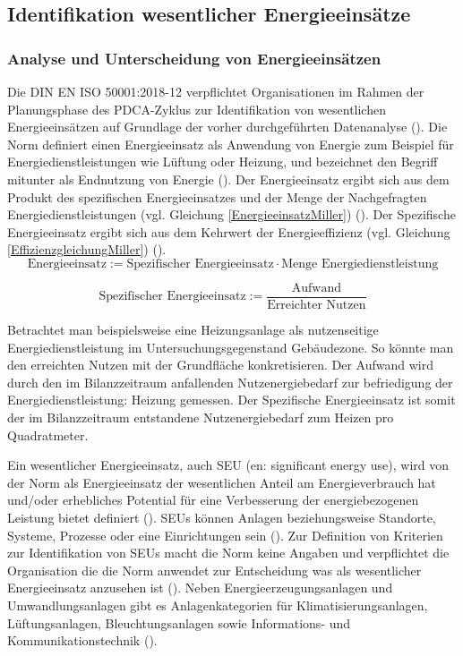 \subsection{Identifikation wesentlicher Energieeinsätze}

\subsubsection{Analyse und Unterscheidung von Energieeinsätzen}

Die DIN EN ISO 50001:2018-12 verpflichtet Organisationen im Rahmen der Planungsphase des PDCA-Zyklus zur Identifikation von wesentlichen Energieeinsätzen auf Grundlage 
der vorher durchgeführten Datenanalyse (\cite[S. 25]{DIN50001.2018}).
Die Norm definiert einen Energieeinsatz als Anwendung von Energie zum Beispiel für Energiedienstleistungen wie Lüftung oder Heizung, und bezeichnet den Begriff mitunter als 
Endnutzung von Energie (\cite[Kapitel 3.5.4]{DIN50001.2018}). 
Der Energieeinsatz ergibt sich aus dem Produkt des spezifischen Energieeinsatzes und der Menge der Nachgefragten Energiedienstleistungen (vgl. Gleichung \eqref{EnergieeinsatzMiller}) (\cite[S. 120]{Miller.2016}).
Der Spezifische Energieeinsatz ergibt sich aus dem Kehrwert der Energieeffizienz (vgl. Gleichung \eqref{EffizienzgleichungMiller}) (\cite[S. 120]{Miller.2016}).
\begin{equation}
    \text{Energieeinsatz} := \text{Spezifischer Energieeinsatz} \cdot \text{Menge Energiedienstleistung}
    \label{EnergieeinsatzMiller}
\end{equation}

\begin{equation}
    \text{Spezifischer Energieeinsatz} :=\frac{\text{Aufwand}}{\text{Erreichter Nutzen}}
    \label{SepzifischerEnergieinsatzMiller}
\end{equation}

Betrachtet man beispielsweise eine Heizungsanlage als nutzenseitige Energiedienstleistung im Untersuchungsgegenstand Gebäudezone.
So könnte man den erreichten Nutzen mit der Grundfläche konkretisieren. 
Der Aufwand wird durch den im Bilanzzeitraum anfallenden Nutzenergiebedarf zur befriedigung der Energiedienstleistung: Heizung gemessen.
Der Spezifische Energieeinsatz ist somit der im Bilanzzeitraum entstandene Nutzenergiebedarf zum Heizen pro Quadratmeter. 

Ein wesentlicher Energieeinsatz, auch SEU (en: significant energy use), wird von der Norm als Energieeinsatz der wesentlichen Anteil am Energieverbrauch 
hat und/oder erhebliches Potential für eine Verbesserung der energiebezogenen Leistung bietet definiert (\cite[Kapitel 3.5.6]{DIN50001.2018}). 
SEUs können Anlagen beziehungsweise Standorte, Systeme, Prozesse oder eine Einrichtungen sein (\cite[Kapitel 3.5.6]{DIN50001.2018}).
Zur Definition von Kriterien zur Identifikation von SEUs macht die Norm keine Angaben und verpflichtet die Organisation die die Norm anwendet zur Entscheidung was 
als wesentlicher Energieeinsatz anzusehen ist (\cite[S. 38]{DIN50001.2018}). 
Neben Energieerzeugungsanlagen und Umwandlungsanlagen gibt es Anlagenkategorien für Klimatisierungsanlagen, 
Lüftungsanlagen, Bleuchtungsanlagen sowie Informations- und Kommunikationstechnik (\cite[S. 14]{Hohnhold.2013}).

